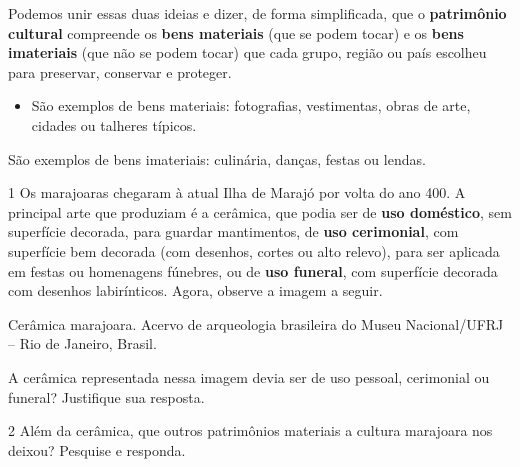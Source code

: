 {Podemos unir essas duas ideias e dizer, de forma
simplificada, que o \textbf{patrimônio cultural} compreende os \textbf{bens materiais}
(que se podem tocar) e os \textbf{bens imateriais} (que não se podem tocar) que cada grupo,
região ou país escolheu para preservar, conservar e proteger.

\begin{itemize}
  \item São exemplos de bens materiais: fotografias, vestimentas, obras de arte,
cidades ou talheres típicos.
\end{itemize}
\item São exemplos de bens imateriais: culinária, danças,
festas ou lendas.}




\num{1} Os marajoaras chegaram à atual Ilha de Marajó por volta do ano 400. A principal arte que produziam é a cerâmica, que podia ser de \textbf{uso doméstico}, sem superfície decorada, para guardar mantimentos, de \textbf{uso cerimonial}, com superfície bem decorada (com desenhos, cortes ou alto relevo), para ser aplicada em festas ou homenagens fúnebres, ou de \textbf{uso funeral}, com superfície decorada com desenhos labirínticos. Agora, observe a imagem a seguir.

Cerâmica marajoara. Acervo de arqueologia brasileira do Museu
Nacional/UFRJ -- Rio de Janeiro, Brasil.

A cerâmica representada nessa imagem devia ser de uso pessoal, cerimonial ou funeral? Justifique sua resposta.



\num{2}  Além da cerâmica, que outros patrimônios materiais a cultura marajoara nos deixou? Pesquise e responda.



